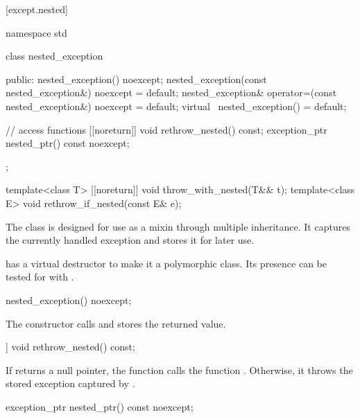 [except.nested]{}

%
\begin{codeblock}
namespace std {
  class nested_exception {
  public:
    nested_exception() noexcept;
    nested_exception(const nested_exception&) noexcept = default;
    nested_exception& operator=(const nested_exception&) noexcept = default;
    virtual ~nested_exception() = default;

    // access functions
    [[noreturn]] void rethrow_nested() const;
    exception_ptr nested_ptr() const noexcept;
  };

  template<class T> [[noreturn]] void throw_with_nested(T&& t);
  template<class E> void rethrow_if_nested(const E& e);
}
\end{codeblock}

\pnum
The class  is designed for use as a mixin through
multiple inheritance. It captures the currently handled exception and stores it
for later use.

\pnum
\begin{note}
 has a virtual destructor to make it a
polymorphic class. Its presence can be tested for with .
\end{note}

%
\begin{itemdecl}
nested_exception() noexcept;
\end{itemdecl}

\begin{itemdescr}
\pnum
\effects
The constructor calls  and stores the returned value.
\end{itemdescr}

%
\begin{itemdecl}
[[noreturn]] void rethrow_nested() const;
\end{itemdecl}

\begin{itemdescr}
\pnum
\effects
If  returns a null pointer, the function calls the function .
Otherwise, it throws the stored exception captured by .
\end{itemdescr}

%
\begin{itemdecl}
exception_ptr nested_ptr() const noexcept;
\end{itemdecl}

